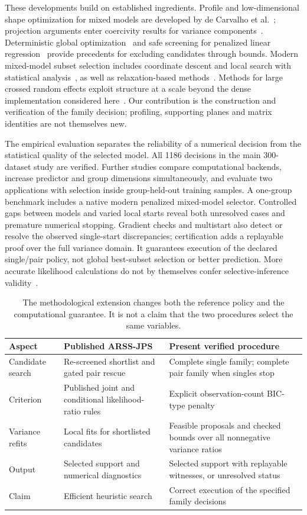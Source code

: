 \documentclass[preprint,11pt,numbers]{elsarticle}
\theoremstyle{remark}\newtheorem{remark}[theorem]{Remark}
\begin{document}
These developments build on established ingredients. Profile and
low-dimensional shape optimization for mixed models are developed by
de Carvalho et al.~\cite{carvalho}; projection arguments enter coercivity
results for variance components~\cite{zhou}. Deterministic global
optimization~\cite{alphabb} and safe screening for penalized linear
regression~\cite{atamturk} provide precedents for excluding candidates through
bounds. Modern mixed-model subset selection includes coordinate descent and
local search with statistical analysis~\cite{thompson}, as well as
relaxation-based methods~\cite{sholokhov}. Methods for large crossed random
effects exploit structure at a scale beyond the dense implementation considered
here~\cite{backfit}. Our contribution is the construction and verification of
the family decision; profiling, supporting planes and matrix identities are
not themselves new.

The empirical evaluation separates the reliability of a numerical decision
from the statistical quality of the selected model. All 1186 decisions in the
main 300-dataset study are verified. Further studies compare computational
backends, increase predictor and group dimensions simultaneously, and evaluate
two applications with selection inside group-held-out training samples.
A one-group benchmark includes a native modern penalized mixed-model selector.
Controlled gaps between models and varied local starts reveal both unresolved
cases and premature numerical stopping. Gradient checks and multistart also
detect or resolve the observed single-start discrepancies; certification adds
a replayable proof over the full variance domain. It guarantees execution of
the declared single/pair policy, not global best-subset selection or better
prediction. More accurate likelihood calculations do not by themselves confer
selective-inference validity~\cite{rugamer}.

\begin{table}[!ht]\centering\small
\begin{tabularx}{\linewidth}{p{.22\linewidth}>{\raggedright\arraybackslash}X>{\raggedright\arraybackslash}X}\toprule
Aspect & Published ARSS-JPS & Present verified procedure\\\midrule
Candidate search & Re-screened shortlist and gated pair rescue & Complete single family; complete pair family when singles stop\\
Criterion & Published joint and conditional likelihood-ratio rules & Explicit observation-count BIC-type penalty\\
Variance refits & Local fits for shortlisted candidates & Feasible proposals and checked bounds over all nonnegative variance ratios\\
Output & Selected support and numerical diagnostics & Selected support with replayable witnesses, or unresolved status\\
Claim & Efficient heuristic search & Correct execution of the specified family decisions\\\bottomrule
\end{tabularx}
\caption{The methodological extension changes both the reference policy and the
computational guarantee. It is not a claim that the two procedures select the
same variables.}
\end{table}
\end{document}
